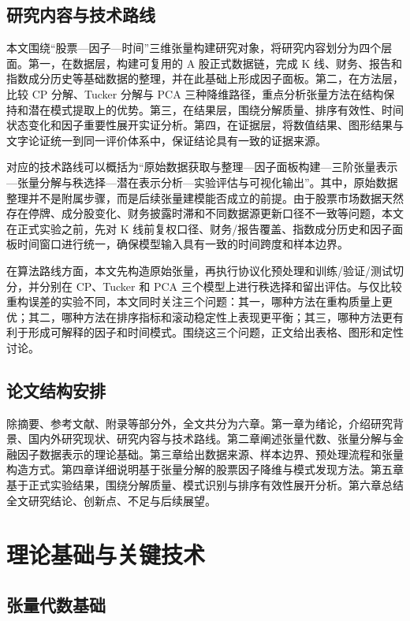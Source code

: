 \section{研究内容与技术路线}

本文围绕“股票—因子—时间”三维张量构建研究对象，将研究内容划分为四个层面。第一，在数据层，构建可复用的 A 股正式数据链，完成 K 线、财务、报告和指数成分历史等基础数据的整理，并在此基础上形成因子面板。第二，在方法层，比较 CP 分解、Tucker 分解与 PCA 三种降维路径，重点分析张量方法在结构保持和潜在模式提取上的优势。第三，在结果层，围绕分解质量、排序有效性、时间状态变化和因子重要性展开实证分析。第四，在证据层，将数值结果、图形结果与文字论证统一到同一评价体系中，保证结论具有一致的证据来源。

对应的技术路线可以概括为“原始数据获取与整理—因子面板构建—三阶张量表示—张量分解与秩选择—潜在表示分析—实验评估与可视化输出”。其中，原始数据整理并不是附属步骤，而是后续张量建模能否成立的前提。由于股票市场数据天然存在停牌、成分股变化、财务披露时滞和不同数据源更新口径不一致等问题，本文在正式实验之前，先对 K 线前复权口径、财务/报告覆盖、指数成分历史和因子面板时间窗口进行统一，确保模型输入具有一致的时间跨度和样本边界。

在算法路线方面，本文先构造原始张量，再执行协议化预处理和训练/验证/测试切分，并分别在 CP、Tucker 和 PCA 三个模型上进行秩选择和留出评估。与仅比较重构误差的实验不同，本文同时关注三个问题：其一，哪种方法在重构质量上更优；其二，哪种方法在排序指标和滚动稳定性上表现更平衡；其三，哪种方法更有利于形成可解释的因子和时间模式。围绕这三个问题，正文给出表格、图形和定性讨论。

\section{论文结构安排}

除摘要、参考文献、附录等部分外，全文共分为六章。第一章为绪论，介绍研究背景、国内外研究现状、研究内容与技术路线。第二章阐述张量代数、张量分解与金融因子数据表示的理论基础。第三章给出数据来源、样本边界、预处理流程和张量构造方式。第四章详细说明基于张量分解的股票因子降维与模式发现方法。第五章基于正式实验结果，围绕分解质量、模式识别与排序有效性展开分析。第六章总结全文研究结论、创新点、不足与后续展望。

\chapter{理论基础与关键技术}

\section{张量代数基础}

